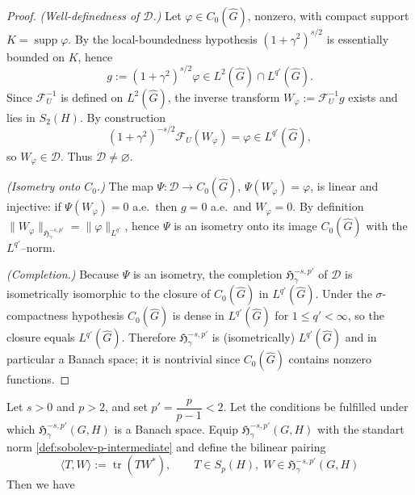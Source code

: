 \documentclass[11pt,a4paper]{article}
\theoremstyle{definition}
\newcommand{\Ghat}{\widehat{G}}
\begin{document}
\begin{proof}
\emph{(Well-definedness of $\mathcal D$.)}
Let $\varphi\in C_0(\widehat G)$, nonzero, with compact support $K=\operatorname{supp}\varphi$. By the local-boundedness hypothesis $(1+\gamma^2)^{s/2}$ is essentially bounded on $K$, hence
\[
g:=(1+\gamma^2)^{s/2}\varphi\in L^2(\widehat G)\cap L^{q'}(\widehat G).
\]
Since $\mathcal F_U^{-1}$ is defined on $L^2(\widehat G)$, the inverse transform
$W_\varphi:=\mathcal F_U^{-1}g$ exists and lies in $S_2(H)$. By construction
\[
(1+\gamma^2)^{-s/2}\mathcal F_U(W_\varphi)=\varphi\in L^{q'}(\widehat G),
\]
so $W_\varphi\in\mathcal D$. Thus $\mathcal D\neq\varnothing$.

\emph{(Isometry onto $C_0$.)}
The map $\Psi:\mathcal D\to C_0(\widehat G)$, $\Psi(W_\varphi)=\varphi$, is linear and injective: if $\Psi(W_\varphi)=0$ a.e.\ then $g=0$ a.e.\ and $W_\varphi=0$. By definition
$\|W_\varphi\|_{\mathfrak{H}^{-s,p'}_\gamma}=\|\varphi\|_{L^{q'}}$, hence $\Psi$ is an isometry onto its image $C_0(\widehat G)$ with the $L^{q'}$--norm.

\emph{(Completion.)}
Because $\Psi$ is an isometry, the completion $\mathfrak{H}^{-s,p'}_\gamma$ of $\mathcal D$ is isometrically isomorphic to the closure of $C_0(\widehat G)$ in $L^{q'}(\widehat G)$. Under the $\sigma$-compactness hypothesis $C_0(\widehat G)$ is dense in $L^{q'}(\widehat G)$ for $1\le q'<\infty$, so the closure equals $L^{q'}(\widehat G)$. Therefore $\mathfrak{H}^{-s,p'}_\gamma$ is (isometrically) $L^{q'}(\widehat G)$ and in particular a Banach space; it is nontrivial since $C_0(\Ghat)$ contains nonzero functions.

\end{proof}











Let $s>0$ and $p>2$, and set $p'=\dfrac{p}{p-1}<2$. Let the conditions be fulfilled under which
$\mathfrak{H}^{-s,p'}_{\gamma}(G,H)$ is a Banach space. Equip $\mathfrak{H}^{-s,p'}_{\gamma}(G,H)$ with the standart norm  \ref{def:sobolev-p-intermediate} and define the bilinear pairing
\[
\langle T, W\rangle := \operatorname{tr}(T W^*),\qquad T\in S_p(H),\; W\in \mathfrak{H}^{-s,p'}_{\gamma}(G,H)
\]
Then we have 
\end{document}

